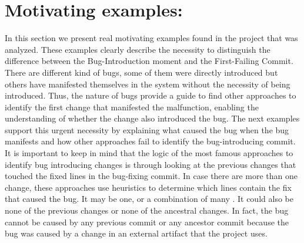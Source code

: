 \documentclass[a4paper, 12pt]{book}
\begin{document}





\section{Motivating examples:}
In this section we present real motivating examples found in the project that was analyzed. These examples clearly describe the necessity to distinguish the difference between the Bug-Introduction moment and the First-Failing Commit. There are different kind of bugs, some of them were directly introduced but others have manifested themselves in the system without the necessity of being introduced. Thus, the nature of bugs provide a guide to find other approaches to identify the first change that manifested the malfunction, enabling the understanding of whether the change also introduced the bug. The next examples support this urgent necessity by explaining what caused the bug when the bug manifests and how other approaches fail to identify the bug-introducing commit. It is important to keep in mind that the logic of the most famous approaches to identify bug introducing changes is through looking at the previous changes that touched the fixed lines in the bug-fixing commit. In case there are more than one change, these approaches use heuristics to determine which lines contain the fix that caused the bug. It may be one, or a combination of many . It could also be none of the previous changes or none of the ancestral changes. In fact, the bug cannot be caused by any previous commit or any ancestor commit because the bug was caused by a change in an external artifact that the project uses.
\end{document}
